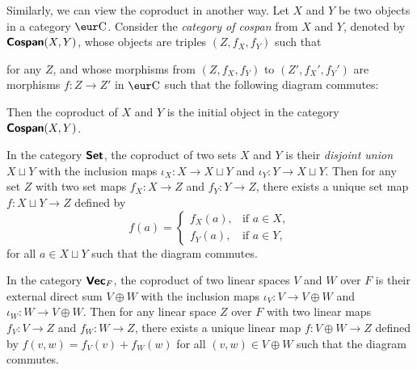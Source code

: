 Similarly, we can view the coproduct in another way. Let $X$ and $Y$ be two objects in a category $\Ca$. Consider the \emph{category of cospan} from $X$ and $Y$, denoted by $\text{\normalfont\bf\sffamily Cospan}(X, Y)$, whose objects are triples $(Z, f_X, f_Y)$ such that  for any $Z$, and whose morphisms from $(Z, f_X, f_Y)$ to $(Z', f_X', f_Y')$ are morphisms $f \colon Z \to Z'$ in $\Ca$ such that the following diagram commutes:
\begin{center}
\end{center}
Then the coproduct of $X$ and $Y$ is the initial object in the category $\text{\normalfont\bf\sffamily Cospan}(X, Y)$.

\begin{example}
  In the category $\operatorname{\text{\normalfont\bf\sffamily Set}}$, the coproduct of two sets $X$ and $Y$ is their \emph{disjoint union} $X \sqcup Y$ with the inclusion maps $\iota_X \colon X \to X \sqcup Y$ and $\iota_Y \colon Y \to X \sqcup Y$. Then for any set $Z$ with two set maps $f_X \colon X \to Z$ and $f_Y \colon Y \to Z$, there exists a unique set map $f \colon X \sqcup Y \to Z$ defined by
  \[
    f(a) = \begin{cases}
      f_X(a), & \text{if } a \in X, \\
      f_Y(a), & \text{if } a \in Y,
    \end{cases}
  \]
  for all $a \in X \sqcup Y$ such that the diagram commutes.
\end{example}

\begin{example}
  In the category $\operatorname{\text{\normalfont\bf\sffamily Vec}}_F$, the coproduct of two linear spaces $V$ and $W$ over $F$ is their external direct sum $V \oplus W$ with the inclusion maps $\iota_V \colon V \to V \oplus W$ and $\iota_W \colon W \to V \oplus W$. Then for any linear space $Z$ over $F$ with two linear maps $f_V \colon V \to Z$ and $f_W \colon W \to Z$, there exists a unique linear map $f \colon V \oplus W \to Z$ defined by $f(v, w) = f_V(v) + f_W(w)$ for all $(v, w) \in V \oplus W$ such that the diagram commutes.
\end{example}

